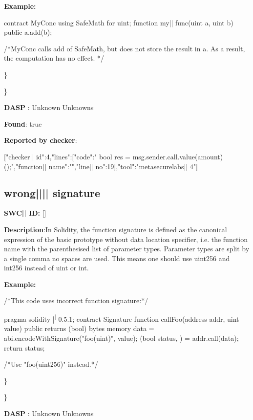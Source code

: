 \documentclass{article}
\begin{document}
\textbf{Example:} 
\begin{ffcode} 

contract MyConc{
    using SafeMath for uint;
    function my|\textunderscore| func(uint a, uint b) public{
        a.add(b);
    }
}

 /*MyConc calls add of SafeMath, but does not store the result in a. As a result, the computation has no effect. */ 

\end{ffcode} 
\} 

\} 

\textbf{DASP} : Unknown Unknowns

\textbf{Found}: true

\textbf{Reported by checker}: 
\begin{ffcode} 

[{"checker|\textunderscore| id":4,"lines":[{"code":"      bool res = msg.sender.call.value(amount)();\n","function|\textunderscore| name":"","line|\textunderscore| no":19}],"tool":"metasecurelabs|\textendash| 4"}]
\end{ffcode} 
\subsection{wrong{||\textunderscore|| }signature} 
\textbf{SWC{|\textunderscore| }ID:} []

\textbf{Description}:In Solidity, the function signature is defined as the canonical expression of the basic prototype without data location specifier, i.e. the function name with the parenthesised list of parameter types. Parameter types are split by a single comma {\textendash} no spaces are used. This means one should use uint256 and int256 instead of uint or int.


\textbf{Example:} 
\begin{ffcode} 

 /*This code uses incorrect function signature:*/ 

pragma solidity |\textsuperscript| 0.5.1;
contract Signature {
    function callFoo(address addr, uint value) public returns (bool) {
        bytes memory data = abi.encodeWithSignature("foo(uint)", value);
        (bool status, ) = addr.call(data);
        return status;
    }
}

/*Use "foo(uint256)" instead.*/

\end{ffcode} 
\} 

\} 

\textbf{DASP} : Unknown Unknowns
\end{document}
